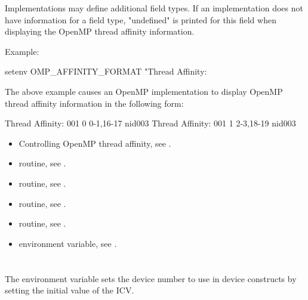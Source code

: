 \linenumbers

Implementations may define additional field types.  If an implementation 
does not have information for a field type, "undefined" is printed for 
this field when displaying the OpenMP thread affinity information.

Example:
\begin{ompEnv}
setenv OMP_AFFINITY_FORMAT
       "Thread Affinity: %
\end{ompEnv}

The above example causes an OpenMP implementation to display OpenMP thread affinity information in the following form:
\begin{ompSyntax}
Thread Affinity: 001        0      0-1,16-17      nid003
Thread Affinity: 001        1      2-3,18-19      nid003
\end{ompSyntax}

\crossreferences
\begin{itemize}
\item Controlling OpenMP thread affinity, see
.

\item {} routine, 
see .

\item {} routine, 
see .

\item {} routine, 
see .

\item {} routine, 
see .

\item {} environment variable, 
see .
\end{itemize}



\section{}
\label{sec:OMP_DEFAULT_DEVICE}
The  environment variable sets the device number to use in
device constructs by setting the initial value of the  ICV.


